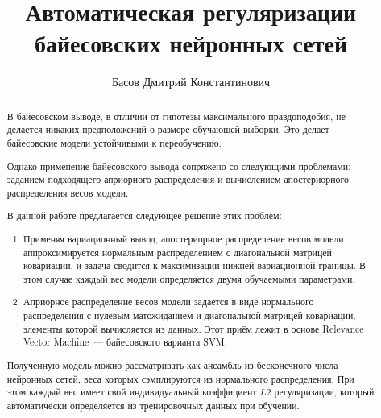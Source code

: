 \documentclass{article}
\title{Автоматическая регуляризации байесовских нейронных сетей}
\author{
    Басов Дмитрий Константинович
}
\date{}
\numberwithin{equation}{section}
\begin{document}
    \maketitle

    \begin{abstract}
        В байесовском выводе, в отличии от гипотезы максимального правдоподобия,
        не делается никаких предположений о размере обучающей выборки.
        Это делает байесовские модели устойчивыми к переобучению.

        Однако применение байесовского вывода сопряжено со следующими проблемами:
        заданием подходящего априорного распределения и вычислением апостериорного распределения весов модели.

        В данной работе предлагается следующее решение этих проблем:
        \begin{enumerate}
            \item Применяя вариационный вывод,
                апостериорное распределение весов модели аппроксимируется
                нормальным распределением с диагональной матрицей ковариации,
                и задача сводится к максимизации нижней вариационной границы.
                В этом случае каждый вес модели определяется двумя обучаемыми параметрами.
            \item Априорное распределение весов модели задается в виде
                нормального распределения с нулевым матожиданием
                и диагональной матрицей ковариации, элементы которой вычисляется из данных.
                Этот приём лежит в основе Relevance Vector Machine~--- байесовского варианта SVM.
        \end{enumerate}

        Полученную модель можно рассматривать как
        ансамбль из бесконечного числа нейронных сетей,
        веса которых сэмплируются из нормального распределения.
        При этом каждый вес имеет свой индивидуальный коэффициент $L2$ регуляризации,
        который автоматически определяется из тренировочных данных при обучении.

    \end{abstract}
\end{document}
